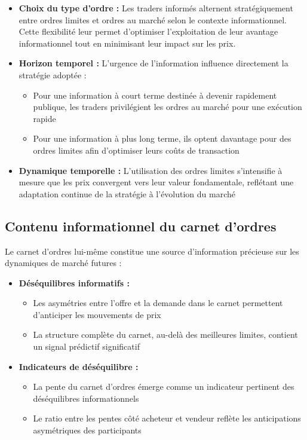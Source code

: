 \documentclass[12pt,a4paper]{article}
\theoremstyle{definition}
\theoremstyle{remark}
\begin{document}
    \begin{itemize}
        \item \textbf{Choix du type d'ordre :} Les traders informés alternent stratégiquement entre ordres limites et ordres au marché selon le contexte informationnel. Cette flexibilité leur permet d'optimiser l'exploitation de leur avantage informationnel tout en minimisant leur impact sur les prix.
        
        \item \textbf{Horizon temporel :} L'urgence de l'information influence directement la stratégie adoptée :
        \begin{itemize}
            \item Pour une information à court terme destinée à devenir rapidement publique, les traders privilégient les ordres au marché pour une exécution rapide
            \item Pour une information à plus long terme, ils optent davantage pour des ordres limites afin d'optimiser leurs coûts de transaction
        \end{itemize}
        
        \item \textbf{Dynamique temporelle :} L'utilisation des ordres limites s'intensifie à mesure que les prix convergent vers leur valeur fondamentale, reflétant une adaptation continue de la stratégie à l'évolution du marché
    \end{itemize}

    \subsection{Contenu informationnel du carnet d'ordres}

    Le carnet d'ordres lui-même constitue une source d'information précieuse sur les dynamiques de marché futures :

    \begin{itemize}
        \item \textbf{Déséquilibres informatifs :} 
        \begin{itemize}
            \item Les asymétries entre l'offre et la demande dans le carnet permettent d'anticiper les mouvements de prix
            \item La structure complète du carnet, au-delà des meilleures limites, contient un signal prédictif significatif
        \end{itemize}
        
        \item \textbf{Indicateurs de déséquilibre :}
        \begin{itemize}
            \item La pente du carnet d'ordres émerge comme un indicateur pertinent des déséquilibres informationnels
            \item Le ratio entre les pentes côté acheteur et vendeur reflète les anticipations asymétriques des participants
        \end{itemize}
    \end{itemize}
\end{document}
